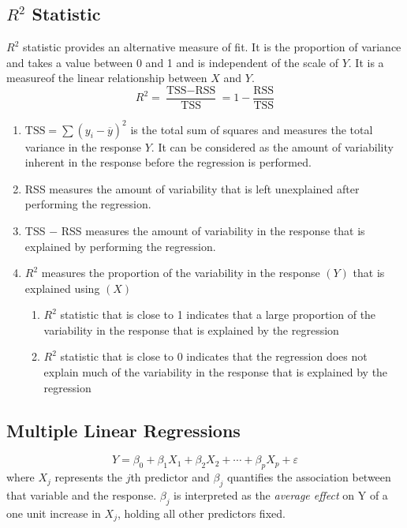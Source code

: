 \documentclass{article}
\begin{document}
\subsection*{$R^{2}$ Statistic}
$R^2$ statistic provides an alternative measure of fit. It is the proportion of variance and takes a value between 0 and 1 and is independent of the scale of $Y$. It is a measureof the linear relationship between $X$ and $Y$.
\begin{equation*} R^2 = \frac{\text{TSS}-\text{RSS}}{\text{TSS}} = 1 - \frac{\text{RSS}}{\text{TSS}} \end{equation*}
\begin{enumerate}
    \item $\text{TSS} = \sum {(y_i - \overline{y})}^2$ is the total sum of squares and measures the total variance in the response $Y$. It can be considered as the amount of variability inherent in the response before the regression is performed.
    \item RSS measures the amount of variability that is left unexplained after performing the regression. 
    \item TSS $-$ RSS measures the amount of variability in the response that is explained by performing the regression. 
    \item $R^2$ measures the proportion of the variability in the response $(Y)$ that is explained using $(X)$
    \begin{enumerate}
        \item $R^2$ statistic that is close to 1 indicates that a large proportion of the variability in the response that is explained by the regression
        \item $R^2$ statistic that is close to 0 indicates that the regression does not explain much of the variability in the response that is explained by the regression
    \end{enumerate}
\end{enumerate}

\subsection*{Multiple Linear Regressions}
\begin{equation*} Y = \beta_0 + \beta_1 X_1 + \beta_2 X_2 + \cdots + \beta_p X_p + \varepsilon \end{equation*}
where $X_j$ represents the $j$th predictor and $\beta_j$ quantifies the association between that variable and the response. $\beta_j$ is interpreted as the \textit{average effect} on Y of a one unit increase in $X_j$, holding all other predictors fixed. 
\end{document}
